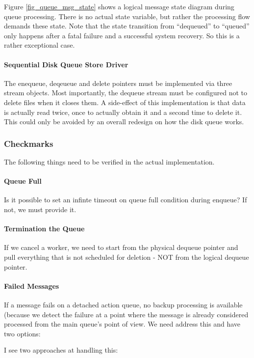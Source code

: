 \documentclass[a4paper,10pt]{article}
\begin{document}
Figure \ref{fig_queue_msg_state} shows a logical message state diagram during queue processing. There is no actual state variable, but rather the processing flow demands these state. Note that the state transition from ``dequeued'' to ``queued'' only happens after a fatal failure and a successful system recovery. So this is a rather exceptional case.

\paragraph{Sequential Disk Queue Store Driver}
The enequeue, deqeueue and delete pointers must be implemented via three stream objects. Most importantly, the dequeue stream must be configured not to delete files when it closes them. A side-effect of this implementation is that data is actually read twice, once to actually obtain it and a second time to delete it. This could only be avoided by an overall redesign on how the disk queue works.

\subsubsection{Checkmarks}
The following things need to be verified in the actual implementation.

\paragraph{Queue Full}
Is it possible to set an infinte timeout on queue full condition during enqueue? If not, we must provide it.

\paragraph{Termination the Queue}
If we cancel a worker, we need to start from the physical dequeue pointer and pull everything that is not scheduled for deletion - NOT from the logical dequeue pointer.

\paragraph{Failed Messages}
If a message fails on a detached action queue, no backup processing is available (because we detect the failure at a point where the message is already considered processed from the main queue's point of view. We need address this and have two options:


I see two approaches at handling this:
\end{document}
